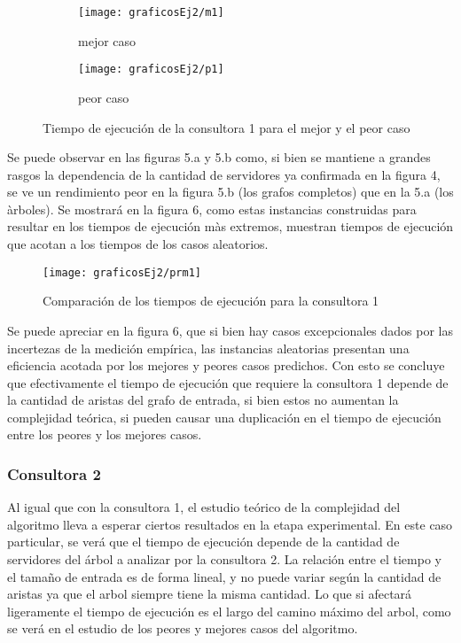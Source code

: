 \documentclass[A4paper,oneside,fleqn,11pt]{article}
\theoremstyle{definition}
\begin{document}
\begin{figure}[H] %
    \begin{subfigure}[b]{0.45\textwidth}
        \texttt{[image: graficosEj2/m1]}
        \caption[center]{mejor caso}
        \label{ni se pa que sirve esto}
    \end{subfigure}
    \begin{subfigure}[b]{0.45\textwidth}
        \texttt{[image: graficosEj2/p1]}
        \caption{peor caso}
        \label{ni se pa que sirve esto}
    \end{subfigure}
    \caption{Tiempo de ejecución de la consultora 1 para el mejor y el peor caso}
\end{figure}

Se puede observar en las figuras 5.a y 5.b como, si bien se mantiene a grandes rasgos la dependencia de la cantidad de servidores ya confirmada en la figura 4, se ve un rendimiento peor en la figura 5.b (los grafos completos) que en la 5.a (los àrboles). Se mostrará en la figura 6, como estas instancias construidas para resultar en los tiempos de ejecución màs extremos, muestran tiempos de ejecución que acotan a los tiempos de los casos aleatorios.

\begin{figure}[H] %
    \texttt{[image: graficosEj2/prm1]}
    \label{ni se pa que sirve esto}
    \caption{Comparación de los tiempos de ejecución para la consultora 1}
\end{figure}

Se puede apreciar en la figura 6, que si bien hay casos excepcionales dados por las incertezas de la medición empírica, las instancias aleatorias presentan una eficiencia acotada por los mejores y peores casos predichos. Con esto se concluye que efectivamente el tiempo de ejecución que requiere la consultora 1 depende de la cantidad de aristas del grafo de entrada, si bien estos no aumentan la complejidad teórica, si pueden causar una duplicación en el  tiempo de ejecución entre los peores y los mejores casos.

\subsubsection{Consultora 2}

Al igual que con la consultora 1, el estudio teórico de la complejidad del algoritmo lleva a esperar ciertos resultados en la etapa experimental. En este caso particular, se verá que el tiempo de ejecución depende de la cantidad de servidores del árbol a analizar por la consultora 2. La relación entre el tiempo y el tamaño de entrada es de forma lineal, y no puede variar según la cantidad de aristas ya que el arbol siempre tiene la misma cantidad. Lo que si afectará ligeramente el tiempo de ejecución es el largo del camino máximo del arbol, como se verá en el estudio de los peores y mejores casos del algoritmo.
\end{document}
